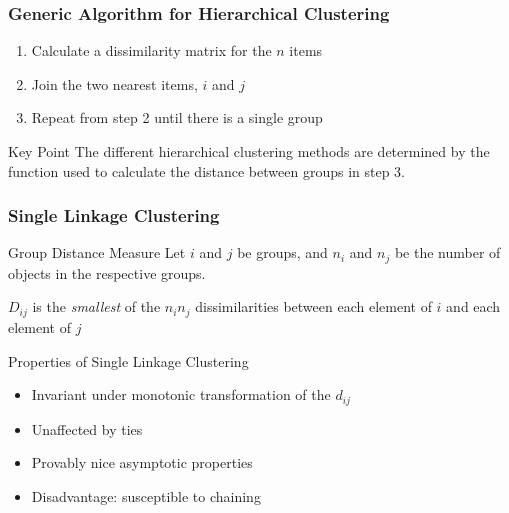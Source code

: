 \documentclass{beamer}
\begin{document}
\begin{frame}
  \frametitle{Generic Algorithm for Hierarchical Clustering}


\begin{enumerate}
  \item Calculate a dissimilarity matrix for the $n$ items
  
  \item Join the two nearest items, $i$ and $j$


  \item Repeat from step 2 until there is a single group
\end{enumerate}

\begin{block}{Key Point}
 The different hierarchical clustering methods are determined by the function used to calculate the distance between groups in step 3.
\end{block}

\end{frame}

\begin{frame}
  \frametitle{Single Linkage Clustering}

\begin{block}{Group Distance Measure}
  Let $i$ and $j$ be groups, and $n_i$ and $n_j$ be the number of objects in the respective groups. 

  \smallskip

  $D_{ij}$ is the \emph{smallest} of the $n_i n_j$ dissimilarities between each element of $i$ and each element of $j$
\end{block}

Properties of Single Linkage Clustering
\begin{itemize}

\item Invariant under monotonic transformation of the $d_{ij}$

\item Unaffected by ties

\item Provably nice asymptotic properties

\item Disadvantage: susceptible to chaining

\end{itemize}

\end{frame}
\end{document}
